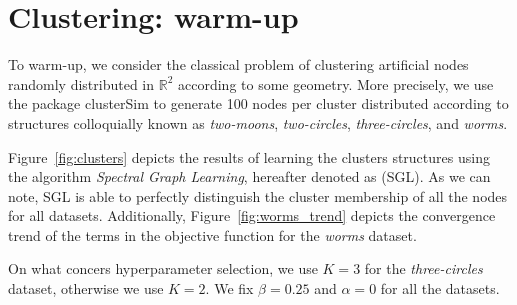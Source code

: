 \section{Clustering: warm-up}
To warm-up, we consider the classical problem of clustering artificial nodes randomly distributed
in $\mathbb{R}^{2}$ according to some geometry. More precisely, we use the package \textsf{clusterSim}
to generate 100 nodes per cluster distributed according to structures colloquially known as \textit{two-moons},
\textit{two-circles}, \textit{three-circles}, and \textit{worms}.

Figure~\ref{fig:clusters} depicts the results of learning the clusters structures using the
algorithm \textit{Spectral Graph Learning}, hereafter denoted as (\textsf{SGL}). As we can note,
\textsf{SGL} is able to perfectly distinguish the cluster membership of all the nodes for all datasets.
Additionally, Figure~\ref{fig:worms_trend} depicts the convergence trend of the terms in the objective
function for the \textit{worms} dataset.

On what concers hyperparameter selection, we use $K = 3$ for the \textit{three-circles}
dataset, otherwise we use $K = 2$. We fix $\beta = 0.25$ and $\alpha = 0$ for all the datasets.

